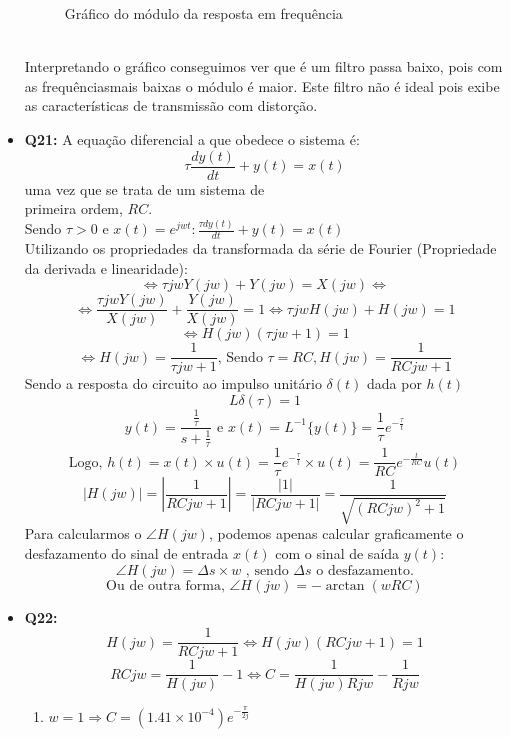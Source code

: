 \documentclass[a4paper, 12pt]{article}
\begin{document}
\begin{itemize}
\begin{figure}[!ht]
              \vspace{-10px}
              \caption{Gráfico do módulo da resposta em frequência}
          \end{figure}
          \\Interpretando o gráfico conseguimos ver que é um filtro passa baixo, pois com as frequênciasmais baixas o módulo é maior. Este filtro não é ideal pois exibe as características de transmissão com distorção.
    \item \textbf{Q21:} A equação diferencial a que obedece o sistema é:
          \[\tau\frac{dy(t)}{dt} + y(t) = x(t)\]
          uma vez que se trata de um sistema de\\
          primeira ordem, $RC$.\\
          Sendo $\tau>0$ e $x(t) = e^{jwt}: \frac{\tau dy(t)}{dt} + y(t) = x(t)$\\
          Utilizando os propriedades da transformada da série de Fourier (Propriedade da derivada e linearidade):
          \[\Leftrightarrow \tau jwY(jw) + Y(jw) = X(jw)\Leftrightarrow\]
          \[\Leftrightarrow \frac{\tau jwY(jw)}{X(jw)} + \frac{Y(jw)}{X(jw)} = 1 \Leftrightarrow \tau jwH(jw) + H(jw) = 1\]
          \[\Leftrightarrow H(jw)(\tau jw + 1) = 1\]
          \[\Leftrightarrow H(jw) = \frac{1}{\tau jw + 1} \textrm{, Sendo } \tau = RC, H(jw) = \frac{1}{RCjw + 1}\]
          Sendo a resposta do circuito ao impulso unitário $\delta(t)$ dada por $h(t)$
          \[L\delta(\tau) = 1\]
          \[y(t) = \frac{\frac{1}{\tau}}{s + \frac{1}{\tau}} \textrm{ e } x(t) = L^{-1}\{y(t)\} = \frac{1}{\tau}e^{-\frac{\tau}{t}}\]
          \[\textrm{Logo, } h(t) = x(t)\times u(t) = \frac{1}{\tau}e^{-\frac{\tau}{t}} \times u(t) = \frac{1}{RC}e^{-\frac{t}{RC}}u(t)\]
          \[ |H(jw)| = \left|\frac{1}{RCjw + 1}\right| = \frac{|1|}{|RCjw +1|} = \frac{1}{\sqrt{{(RCjw)}^{2} + 1}}\]
          Para calcularmos o $\angle H(jw)$, podemos apenas calcular graficamente o desfazamento do sinal de entrada $x(t)$ com o sinal de saída $y(t)$:
          \[\angle H(jw) = \Delta s \times w \textrm{ , sendo } \Delta s \textrm{ o desfazamento.}\]
          \[\textrm{Ou de outra forma, } \angle H(jw) = -\arctan(wRC)\]
    \item \textbf{Q22:}
          \[H(jw) = \frac{1}{RCjw + 1} \Leftrightarrow H(jw)(RCjw + 1) = 1\]
          \[RCjw = \frac{1}{H(jw)} - 1 \Leftrightarrow C = \frac{1}{H(jw)Rjw} - \frac{1}{Rjw}\]
          \begin{enumerate}
              \item[] $w = 1 \Rightarrow C = (1.41 \times 10^{-4})e^{-\frac{\pi}{2j}}$

\end{enumerate}
\end{itemize}
\end{document}
